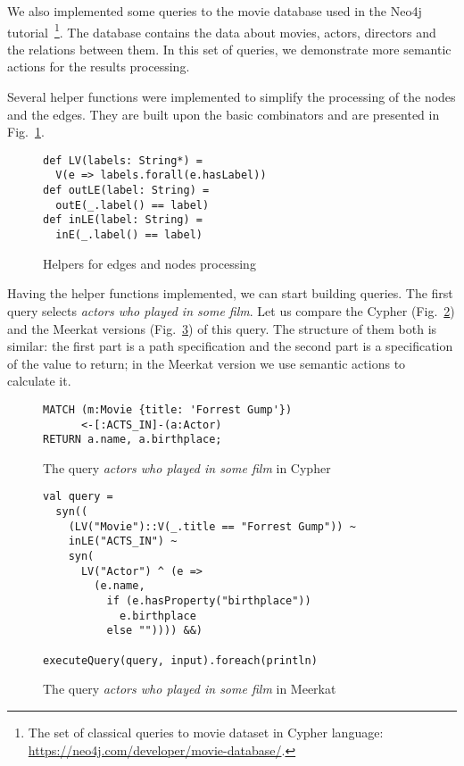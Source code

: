 We also implemented some queries to the movie database used in the Neo4j tutorial~\footnote{The set of classical queries to movie dataset in Cypher language: \url{https://neo4j.com/developer/movie-database/}.}.
The database contains the data about movies, actors, directors and the relations between them.
In this set of queries, we demonstrate more semantic actions for the results processing.

Several helper functions were implemented to simplify the processing of the nodes and the edges.
They are built upon the basic combinators and are presented in Fig.~\ref{fig:helpers}.

\begin{figure}[h]
\begin{lstlisting}
def LV(labels: String*) =
  V(e => labels.forall(e.hasLabel))
def outLE(label: String) =
  outE(_.label() == label)
def inLE(label: String) =
  inE(_.label() == label)
\end{lstlisting}
\caption{Helpers for edges and nodes processing}
\label{fig:helpers}
\end{figure}

Having the helper functions implemented, we can start building queries.
The first query selects \emph{actors who played in some film}.
Let us compare the Cypher (Fig.~\ref{fig:Q1_C}) and the Meerkat versions (Fig.~\ref{fig:Q1_M}) of this query.
The structure of them both is similar: the first part is a path specification and the second part is a specification of the value to return; in the Meerkat version we use semantic actions to calculate it.

\begin{figure}[h]
\begin{lstlisting}
MATCH (m:Movie {title: 'Forrest Gump'})
      <-[:ACTS_IN]-(a:Actor)
RETURN a.name, a.birthplace;
\end{lstlisting}
\caption{The query \emph{actors who played in some film} in Cypher}
\label{fig:Q1_C}
\end{figure}


\begin{figure}[h]
\begin{lstlisting}
val query =
  syn((
    (LV("Movie")::V(_.title == "Forrest Gump")) ~
    inLE("ACTS_IN") ~
    syn(
      LV("Actor") ^ (e =>
        (e.name,
          if (e.hasProperty("birthplace"))
            e.birthplace
          else "")))) &&)

executeQuery(query, input).foreach(println)
\end{lstlisting}
\caption{The query \emph{actors who played in some film} in Meerkat}
\label{fig:Q1_M}
\end{figure}


